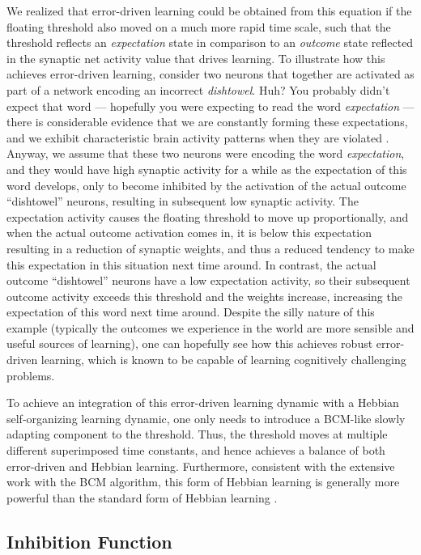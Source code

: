 \documentclass[11pt,twoside]{article}
\begin{document}
We realized that error-driven learning could be obtained from this equation if the floating threshold also moved on a much more rapid time scale, such that the threshold reflects an {\em expectation} state in comparison to an {\em outcome} state reflected in the synaptic net activity value that drives learning.  To illustrate how this achieves error-driven learning, consider two neurons that together are activated as part of a network encoding an incorrect {\em dishtowel}.  Huh?  You probably didn't expect that word --- hopefully you were expecting to read the word {\em expectation} --- there is considerable evidence that we are constantly forming these expectations, and we exhibit characteristic brain activity patterns when they are violated \cite{P300}.  Anyway, we assume that these two neurons were encoding the word {\em expectation}, and they would have high synaptic activity for a while as the expectation of this word develops, only to become inhibited by the activation of the actual outcome ``dishtowel'' neurons, resulting in subsequent low synaptic activity.  The expectation activity causes the floating threshold to move up proportionally, and when the actual outcome activation comes in, it is below this expectation resulting in a reduction of synaptic weights, and thus a reduced tendency to make this expectation in this situation next time around.  In contrast, the actual outcome ``dishtowel'' neurons have a low expectation activity, so their subsequent outcome activity exceeds this threshold and the weights increase, increasing the expectation of this word next time around.  Despite the silly nature of this example (typically the outcomes we experience in the world are more sensible and useful sources of learning), one can hopefully see how this achieves robust error-driven learning, which is known to be capable of learning cognitively challenging problems.

To achieve an integration of this error-driven learning dynamic with a Hebbian self-organizing learning dynamic, one only needs to introduce a BCM-like slowly adapting component to the threshold.  Thus, the threshold moves at multiple different superimposed time constants, and hence achieves a balance of both error-driven and Hebbian learning.  Furthermore, consistent with the extensive work with the BCM algorithm, this form of Hebbian learning is generally more powerful than the standard form of Hebbian learning \cite{bcm cites}.

\subsection{Inhibition Function}
\end{document}
